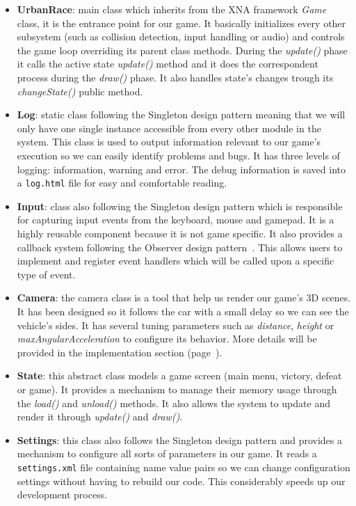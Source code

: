 \begin{itemize}
	\item \textbf{UrbanRace}: main class which inherits from the XNA framework \textit{Game}
	class, it is the entrance point for our game. It basically initializes
	every other subsystem (such as collision detection, input handling or audio) and controls
	the game loop overriding its parent class methods. During the \textit{update()}
	phase it calls the active state \textit{update()} method and it does the correspondent
	process during the \textit{draw()} phase. It also handles state's changes trough its
	\textit{changeState()} public method.
	\item \textbf{Log}: static class following the Singleton design pattern \cite{gamm94}
	meaning that we will only have one single instance accessible from every other module
	in the system. This class is used to output information relevant to our game's execution
	so we can easily identify problems and bugs. It has three levels of logging: information,
	warning and error. The debug information is saved into a \texttt{log.html} file for
	easy and comfortable reading.
	\item \textbf{Input}: class also following the Singleton design pattern \cite{gamm94} which
	is responsible for capturing input events from the keyboard, mouse and gamepad. It is a
	highly reusable component because it is not game specific. It also provides a callback
	system following the Observer design pattern~\cite{gamm94}. This allows users to implement
	and register event handlers which will be called upon a specific type of event.
	\item \textbf{Camera}: the camera class is a tool that help us render our game's 3D scenes.
	It has been designed so it follows the car with a small delay so we can see the vehicle's
	sides. It has several tuning parameters such as \textit{distance}, \textit{height} or
	\textit{maxAngularAcceleration} to configure its behavior. More details will be provided
	in the implementation section (page~\pageref{sec:implementation}).
	\item \textbf{State}: this abstract class models a game screen (main menu, victory, defeat
	or game). It provides a mechanism to manage their memory usage through the \textit{load()}
	and \textit{unload()} methods. It also allows the system to update and render it through
	\textit{update()} and \textit{draw()}.
	\item \textbf{Settings}: this class also follows the Singleton design pattern \cite{gamm94}
	and provides a mechanism to configure all sorts of parameters in our game. It reads a
	\texttt{settings.xml} file containing name value pairs so we can change configuration
	settings without having to rebuild our code. This considerably speeds up our development
	process.
\end{itemize}

